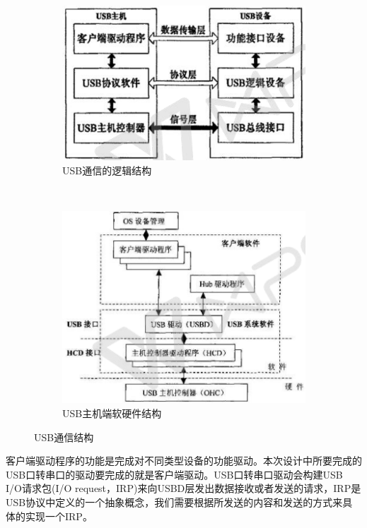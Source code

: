 \begin{figure}[h]
\centering
  \begin{subfigure}[b]{0.4\textwidth}
  \includegraphics[width=1.0\textwidth]{./graphics/USB-device-structure-diagram.pdf}
  \caption{USB通信的逻辑结构}\label{fig:usb通信逻辑结构}
  \end{subfigure}
  ~
  \begin{subfigure}[b]{0.5\textwidth}
  \includegraphics[width=1.0\textwidth]{./graphics/USB-PC-structure.pdf}
  \caption{USB主机端软硬件结构}\label{fig:usb-PC}
  \end{subfigure}
\caption{USB通信结构}\label{fig:USB通信结构}
\end{figure}

	
	客户端驱动程序的功能是完成对不同类型设备的功能驱动。本次设计中所要完成的USB口转串口的驱动要完成的就是客户端驱动。USB口转串口驱动会构建USB I/O请求包(I/O request，IRP)来向USBD层发出数据接收或者发送的请求，IRP是USB协议中定义的一个抽象概念，我们需要根据所发送的内容和发送的方式来具体的实现一个IRP\cite{李雪红2004USB}。
	
